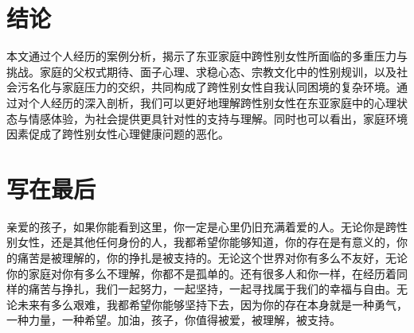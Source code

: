 \documentclass[twocolumn]{ctexart}
\begin{document}
\section{结论}
本文通过个人经历的案例分析，揭示了东亚家庭中跨性别女性所面临的多重压力与挑战。家庭的父权式期待、面子心理、求稳心态、宗教文化中的性别规训，以及社会污名化与家庭压力的交织，共同构成了跨性别女性自我认同困境的复杂环境。通过对个人经历的深入剖析，我们可以更好地理解跨性别女性在东亚家庭中的心理状态与情感体验，为社会提供更具针对性的支持与理解。同时也可以看出，家庭环境因素促成了跨性别女性心理健康问题的恶化\cite{amnesty2019transmedical}。

\onecolumn
\section{写在最后}
亲爱的孩子，如果你能看到这里，你一定是心里仍旧充满着爱的人。无论你是跨性别女性，还是其他任何身份的人，我都希望你能够知道，你的存在是有意义的，你的痛苦是被理解的，你的挣扎是被支持的。无论这个世界对你有多么不友好，无论你的家庭对你有多么不理解，你都不是孤单的。还有很多人和你一样，在经历着同样的痛苦与挣扎，我们一起努力，一起坚持，一起寻找属于我们的幸福与自由。无论未来有多么艰难，我都希望你能够坚持下去，因为你的存在本身就是一种勇气，一种力量，一种希望。加油，孩子，你值得被爱，被理解，被支持。

\clearpage
\nocite{*}
 
\end{document}
